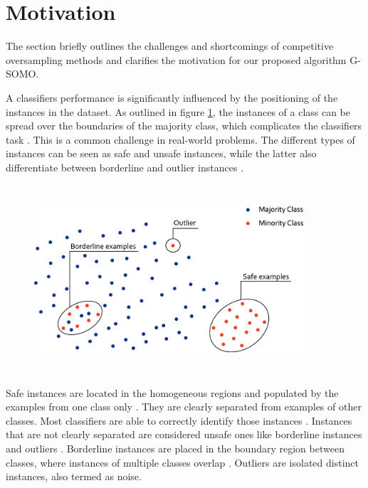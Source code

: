 \documentclass[parskip=full]{scrartcl}
\begin{document}
\section{Motivation}

The section briefly outlines the challenges and shortcomings of competitive
oversampling methods and clarifies the motivation for our proposed algorithm
G-SOMO.

A classifiers performance is significantly influenced by the positioning of the
instances in the dataset. As outlined in figure \ref{fig:Saez}, the instances of
a class can be spread over the boundaries of the majority class, which
complicates the classifiers task \cite{Tang}. This is a common challenge in
real-world problems. The different types of instances can be seen as safe and
unsafe instances, while the latter also differentiate between borderline and
outlier instances \cite{Saez}.

\begin{figure}[H]
	\centering
	\includegraphics[width=10cm,height=7cm, keepaspectratio]{./resources/fig2.png}
	\label{fig:Saez}
\end{figure}

Safe instances are located in the homogeneous regions and populated by the
examples from one class only \cite{rodriguez2012hybrid}. They are clearly
separated from examples of other classes. Most classifiers are able to correctly
identify those instances \cite{Prati2004B}. Instances that are not clearly
separated are considered unsafe ones like borderline instances and outliers
\cite{Kubat2000}. Borderline instances are placed in the boundary region between
classes, where instances of multiple classes overlap \cite{Saez}. Outliers are
isolated distinct instances, also termed as noise. 
\end{document}
